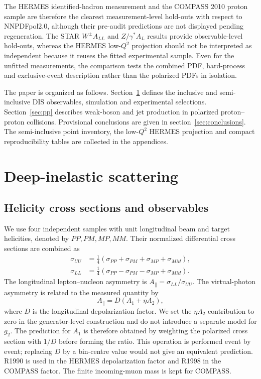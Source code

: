 \documentclass[11pt,a4paper]{article}
\newcommand{\ap}{A_{\parallel}}
\newcommand{\suu}{\sigma_{UU}}
\newcommand{\sll}{\sigma_{LL}}
\begin{document}
The HERMES identified-hadron measurement and the COMPASS 2010 proton sample
are therefore the clearest measurement-level hold-outs with respect to
NNPDFpol2.0, although their pre-audit predictions are not displayed pending
regeneration.  The STAR $W^\pm A_{LL}$ and $Z/\gamma^* A_L$ results provide
observable-level hold-outs, whereas the HERMES low-$Q^2$ projection should
not be interpreted as independent because it reuses the fitted experimental
sample.  Even for the unfitted measurements, the comparison tests the
combined PDF, hard-process and exclusive-event description rather than the
polarized PDFs in isolation.

The paper is organized as follows.  Section~\ref{sec:dis} defines the
inclusive and semi-inclusive DIS observables, simulation and experimental
selections.  Section~\ref{sec:pp} describes weak-boson and jet production in
polarized proton--proton collisions.  Provisional conclusions are given in
section~\ref{sec:conclusions}.  The semi-inclusive point inventory, the
low-$Q^2$ HERMES projection and compact reproducibility tables are collected
in the appendices.

\FloatBarrier
\section{Deep-inelastic scattering}
\label{sec:dis}

\subsection{Helicity cross sections and observables}

We use four independent samples with unit longitudinal beam and target
helicities, denoted by $PP,PM,MP,MM$.  Their normalized differential cross
sections are combined as
\begin{align}
  \suu &= \frac{1}{4}\left(\sigma_{PP}+\sigma_{PM}
              +\sigma_{MP}+\sigma_{MM}\right),
  \\
  \sll &= \frac{1}{4}\left(\sigma_{PP}-\sigma_{PM}
              -\sigma_{MP}+\sigma_{MM}\right).
  \label{eq:dis-combinations}
\end{align}
The longitudinal lepton--nucleon asymmetry is
$\ap=\sll/\suu$.  The virtual-photon asymmetry is related to the measured
quantity by
\begin{equation}
  \ap = D\left(A_1+\eta A_2\right),
  \label{eq:depolarization}
\end{equation}
where $D$ is the longitudinal depolarization factor.  We set
the $\eta A_2$ contribution to zero in the generator-level construction and
do not introduce a separate model for $g_2$.  The prediction for $A_1$ is
therefore obtained by weighting the polarized cross section with $1/D$ before
forming the ratio.  This operation is performed event by event; replacing
$D$ by a bin-centre value would not give an equivalent prediction.  R1990 is
used in the HERMES depolarization factor and R1998 in the COMPASS factor.  The
finite incoming-muon mass is kept for COMPASS.
\end{document}
